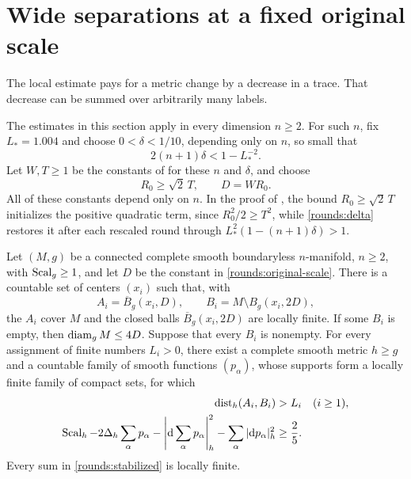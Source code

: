 \section{Wide separations at a fixed original scale}\label{sec:rounds}

The local estimate pays for a metric change by a decrease in a trace.
That decrease can be summed over arbitrarily many labels.

The estimates in this section apply in every dimension \(n\ge2\). For
such \(n\), fix \(L_*=1.004\) and choose \(0<\delta<1/10\), depending only
on \(n\), so small that
\begin{equation}\label{rounds:delta}
  2(n+1)\delta<1-L_*^{-2}.
\end{equation}
Let \(W,T\ge1\) be the constants of  for these \(n\) and
\(\delta\), and choose
\begin{equation}\label{rounds:original-scale}
  R_0\ge\sqrt2\,T,\qquad D=WR_0.
\end{equation}
All of these constants depend only on \(n\). In the proof of
, the bound \(R_0\ge\sqrt2\,T\) initializes the
positive quadratic term, since \(R_0^2/2\ge T^2\), while
\eqref{rounds:delta} restores it after each rescaled round through
\(L_*^2(1-(n+1)\delta)>1\).

\begin{theorem}\label{rounds:wide}
Let \((M,g)\) be a connected complete smooth boundaryless
\(n\)-manifold, \(n\ge2\), with \(\operatorname{Scal}_g\ge1\), and let \(D\) be the
constant in \eqref{rounds:original-scale}. There is a countable set of
centers \((x_i)\) such that, with
\[
 A_i=\overline B_g(x_i,D),\qquad
 B_i=M\setminus B_g(x_i,2D),
\]
the \(A_i\) cover \(M\) and the closed balls \(\overline B_g(x_i,2D)\)
are locally finite. If some \(B_i\) is empty, then \(\operatorname{diam}_g M\le4D\).
Suppose
that every \(B_i\) is nonempty. For every assignment of finite numbers \(L_i>0\), there
exist a complete smooth metric \(h\ge g\) and a countable family of
smooth functions \((p_\alpha)\), whose supports form a locally finite
family of compact sets, for which
\begin{align}
 \operatorname{dist}_h(A_i,B_i)&>L_i \quad(i\ge1),\label{rounds:prescribed}\\
 \operatorname{Scal}_h-2\Delta_h\sum_\alpha p_\alpha
       -\left|\mathrm d\sum_\alpha p_\alpha\right|_h^2
       -\sum_\alpha|\mathrm d p_\alpha|_h^2&\ge\frac25.\label{rounds:stabilized}
\end{align}
Every sum in \eqref{rounds:stabilized} is locally finite.
\end{theorem}

